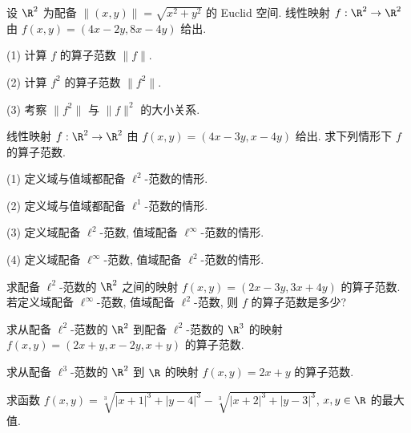 \begin{exercise}\label{exer:1.11}
设 $\R^{2}$ 为配备 $\|(x, y)\| = \sqrt{x^{2} + y^{2}}$ 的 Euclid 空间. 线性映射 $f: \R^{2} \to \R^{2}$ 由 $f(x, y) = (4x - 2y, 8x - 4y)$ 给出.

(1) 计算 $f$ 的算子范数 $\|f\|$.

(2) 计算 $f^{2}$ 的算子范数 $\|f^{2}\|$.

(3) 考察 $\|f^{2}\|$ 与 $\|f\|^{2}$ 的大小关系.
\end{exercise}

\begin{exercise}\label{exer:1.12}
线性映射 $f: \R^{2} \to \R^{2}$ 由 $f(x, y) = (4x - 3y, x - 4y)$ 给出. 求下列情形下 $f$ 的算子范数.

(1) 定义域与值域都配备 $\ell^{2}$-范数的情形.

(2) 定义域与值域都配备 $\ell^{1}$-范数的情形.

(3) 定义域配备 $\ell^{2}$-范数, 值域配备 $\ell^{\infty}$-范数的情形.

(4) 定义域配备 $\ell^{\infty}$-范数, 值域配备 $\ell^{2}$-范数的情形.
\end{exercise}

\begin{exercise}\label{exer:1.13}
求配备 $\ell^{2}$-范数的 $\R^{2}$ 之间的映射 $f(x, y) = (2x - 3y, 3x + 4y)$ 的算子范数. 若定义域配备 $\ell^{\infty}$-范数, 值域配备 $\ell^{2}$-范数, 则 $f$ 的算子范数是多少?
\end{exercise}

\begin{exercise}\label{exer:1.14}
求从配备 $\ell^{2}$-范数的 $\R^{2}$ 到配备 $\ell^{2}$-范数的 $\R^{3}$ 的映射 $f(x, y) = (2x + y, x - 2y, x + y)$ 的算子范数.
\end{exercise}

\begin{exercise}\label{exer:1.15}
求从配备 $\ell^{3}$-范数的 $\R^{2}$ 到 $\R$ 的映射 $f(x, y) = 2x + y$ 的算子范数.
\end{exercise}

\begin{exercise}\label{exer:1.16}
求函数 $f(x, y) = \sqrt[3]{|x+1|^{3} + |y-4|^{3}} - \sqrt[3]{|x+2|^{3} + |y-3|^{3}}$, $x, y \in \R$ 的最大值.
\end{exercise}
